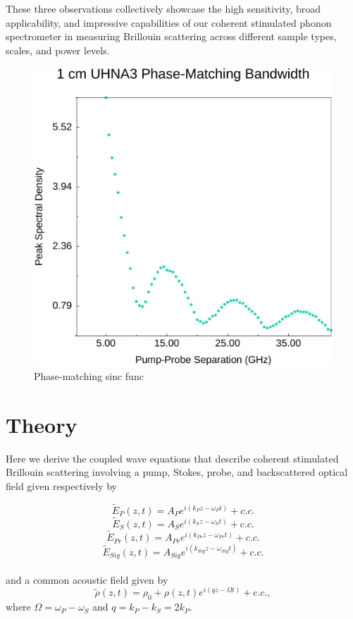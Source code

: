 \documentclass[sn-nature]{sn-jnl}%
\begin{document}
These three observations collectively showcase the high sensitivity, broad applicability, and impressive capabilities of our coherent stimulated phonon spectrometer in measuring Brillouin scattering across different sample types, scales, and power levels.

\begin{figure}[t]
\centering
\includegraphics[width=.45\textwidth]{Phase-Match.pdf}
\caption{Phase-matching sinc func}\label{fig:Phase-Match}
\end{figure}

\section{Theory}\label{Theory}

Here we derive the coupled wave equations that describe coherent stimulated Brillouin scattering involving a pump, Stokes, probe, and backscattered optical field given respectively by

\begin{equation}
    \tilde{E}_{P}(z,t) = A_{P}e^{i(k_{P}z - \omega_{P}t)} + c.c.
    \label{eq:Pump optical field}
\end{equation}
\begin{equation}
    \tilde{E}_{S}(z,t) = A_{S}e^{i(k_{S}z - \omega_{S}t)} + c.c.
    \label{eq:Stokes optical field}
\end{equation}
\begin{equation}
    \tilde{E}_{Pr}(z,t) = A_{Pr}e^{i(k_{Pr}z - \omega_{Pr}t)} + c.c.
    \label{eq:Probe optical field}
\end{equation}
\begin{equation}
    \tilde{E}_{Sig}(z,t) = A_{Sig}e^{i(k_{Sig}z - \omega_{Sig}t)} + c.c.
    \label{eq:Signal optical field}
\end{equation}
\\
\noindent and a common acoustic field given by
\begin{equation}
    \tilde{\rho}(z,t) = \rho_{0} + \rho(z,t)e^{i(qz - \Omega t)} + c.c.,
    \label{eq:acoustic field}
\end{equation}
\noindent where $\Omega = \omega_{P} - \omega_{S}$ and $q = k_{P} - k_{S} = 2k_{P}$.
\end{document}
